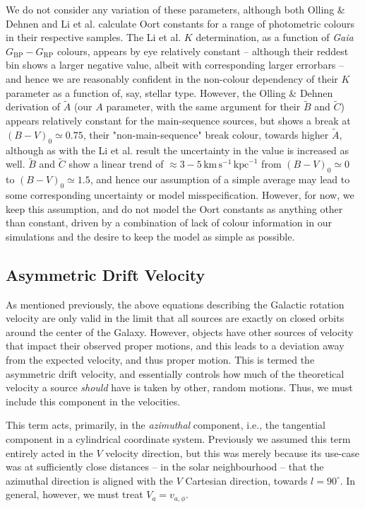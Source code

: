 \documentclass[fleqn,usenatbib]{mnras}
\begin{document}
We do not consider any variation of these parameters, although both Olling \& Dehnen and Li et al. calculate Oort constants for a range of photometric colours in their respective samples. The Li et al. $K$ determination, as a function of \textit{Gaia} $G_\mathrm{BP} - G_\mathrm{RP}$ colours, appears by eye relatively constant -- although their reddest bin shows a larger negative value, albeit with corresponding larger errorbars -- and hence we are reasonably confident in the non-colour dependency of their $K$ parameter as a function of, say, stellar type. However, the Olling \& Dehnen derivation of $\widetilde{A}$ (our $A$ parameter, with the same argument for their $\widetilde{B}$ and $\widetilde{C}$) appears relatively constant for the main-sequence sources, but shows a break at $(B - V)_0 \simeq 0.75$, their "non-main-sequence" break colour, towards higher $\widetilde{A}$, although as with the Li et al. result the uncertainty in the value is increased as well. $\widetilde{B}$ and $\widetilde{C}$ show a linear trend of $\approx 3-5\,\mathrm{km}\,\mathrm{s}^{-1}\,\mathrm{kpc}^{-1}$ from $(B - V)_0 \simeq 0$ to $(B - V)_0 \simeq 1.5$, and hence our assumption of a simple average may lead to some corresponding uncertainty or model misspecification. However, for now, we keep this assumption, and do not model the Oort constants as anything other than constant, driven by a combination of lack of colour information in our simulations and the desire to keep the model as simple as possible.

\subsection{Asymmetric Drift Velocity}
As mentioned previously, the above equations describing the Galactic rotation velocity are only valid in the limit that all sources are exactly on closed orbits around the center of the Galaxy. However, objects have other sources of velocity that impact their observed proper motions, and this leads to a deviation away from the expected velocity, and thus proper motion. This is termed the asymmetric drift velocity, and essentially controls how much of the theoretical velocity a source \textit{should} have is taken by other, random motions. Thus, we must include this component in the velocities.

This term acts, primarily, in the \textit{azimuthal} component, i.e., the tangential component in a cylindrical coordinate system. Previously we assumed this term entirely acted in the $V$ velocity direction, but this was merely because its use-case was at sufficiently close distances -- in the solar neighbourhood -- that the azimuthal direction is aligned with the $V$ Cartesian direction, towards $l = 90^\circ$. In general, however, we must treat $V_a = v_{a,\phi}$.
\end{document}
